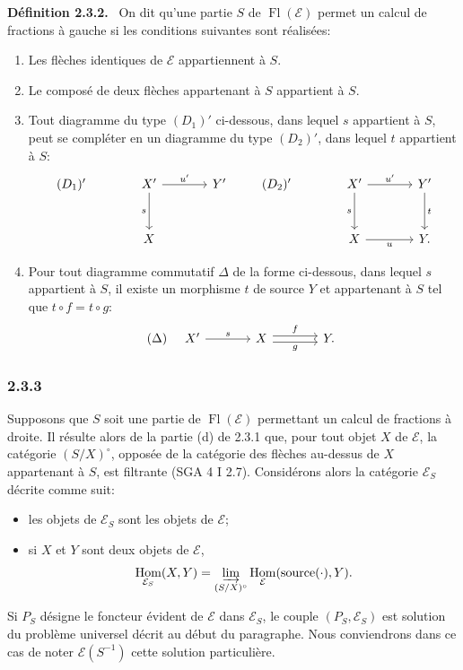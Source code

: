 \documentclass[11pt]{article}
\newenvironment{statement}[1]{\par\medskip\noindent\textbf{#1.}\ }{\par\medskip}
\DeclareMathOperator{\Hom}{Hom}
\providecommand{\Hom}{\operatorname{Hom}}
\providecommand{\Fl}{\operatorname{Fl}}
\providecommand{\cE}{\mathcal E}
\providecommand{\source}{\operatorname{source}}
\begin{document}
\begin{statement}{Définition 2.3.2}
On dit qu'une partie $S$ de $\Fl(\cE)$ permet un calcul de fractions à gauche si les conditions suivantes sont réalisées:
\begin{enumerate}[label=(\alph*)]
\item[(a')] Les flèches identiques de $\cE$ appartiennent à $S$.
\item[(b')] Le composé de deux flèches appartenant à $S$ appartient à $S$.
\item[(c')] Tout diagramme du type $(D_1)'$ ci-dessous, dans lequel $s$ appartient à $S$, peut se compléter en un diagramme du type $(D_2)'$, dans lequel $t$ appartient à $S$:
\[
\begin{tikzcd}[column sep=large,row sep=large]
(D_1)'& X' \arrow[r,"u'"] \arrow[d,"s"'] & Y'\\
& X
\end{tikzcd}
\qquad
\begin{tikzcd}[column sep=large,row sep=large]
(D_2)'& X' \arrow[r,"u'"] \arrow[d,"s"'] & Y' \arrow[d,"t"]\\
& X \arrow[r,"u"'] & Y .
\end{tikzcd}
\]
\item[(d')] Pour tout diagramme commutatif $\Delta$ de la forme ci-dessous, dans lequel $s$ appartient à $S$, il existe un morphisme $t$ de source $Y$ et appartenant à $S$ tel que $t\circ f=t\circ g$:
\[
(\Delta)\quad
\begin{tikzcd}[column sep=large]
X' \arrow[r,"s"] & X \arrow[r,shift left,"f"] \arrow[r,shift right,"g"'] & Y .
\end{tikzcd}
\]
\end{enumerate}
\end{statement}

\subsubsection*{2.3.3}
Supposons que $S$ soit une partie de $\Fl(\cE)$ permettant un calcul de fractions à droite. Il résulte alors de la partie (d) de 2.3.1 que, pour tout objet $X$ de $\cE$, la catégorie $(S/X)^\circ$, opposée de la catégorie des flèches au-dessus de $X$ appartenant à $S$, est filtrante (SGA 4 I 2.7). Considérons alors la catégorie $\cE_S$ décrite comme suit:
\begin{itemize}
\item les objets de $\cE_S$ sont les objets de $\cE$;
\item si $X$ et $Y$ sont deux objets de $\cE$,
\[
\Hom_{\cE_S}(X,Y)=\varinjlim_{(S/X)^\circ}\Hom_{\cE}(\source(\cdot),Y).
\]
\end{itemize}
Si $P_S$ désigne le foncteur évident de $\cE$ dans $\cE_S$, le couple $(P_S,\cE_S)$ est solution du problème universel décrit au début du paragraphe. Nous conviendrons dans ce cas de noter $\cE(S^{-1})$ cette solution particulière.
\end{document}
